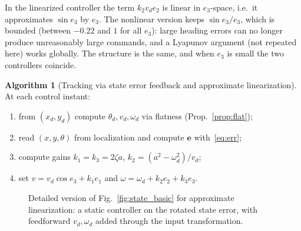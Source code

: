 \documentclass[11pt,a4paper]{article}
\newcommand{\vect}[1]{\bm{#1}}
\newcommand{\vd}{v_d}
\newcommand{\omd}{\omega_d}
\newcommand{\pd}{\vect{p}_d}
\newcommand{\qd}{\vect{q}_d}
\theoremstyle{plain}
\theoremstyle{definition}
\newtheorem{algorithm}[theorem]{Algorithm}
\theoremstyle{remark}
\begin{document}
\begin{intuition}
In the linearized controller the term $k_2\vd e_2$ is linear in $e_3$-space, i.e.\ it approximates $\sin e_3$ by $e_3$. The nonlinear version keeps $\sin e_3/e_3$, which is bounded (between $-0.22$ and $1$ for all $e_3$): large heading errors can no longer produce unreasonably large commands, and a Lyapunov argument (not repeated here) works globally. The structure is the same, and when $e_3$ is small the two controllers coincide.
\end{intuition}

\begin{algorithm}[Tracking via state error feedback and approximate linearization]
At each control instant:
\begin{enumerate}[nosep]
\item from $(x_d,y_d)$ compute $\theta_d,\vd,\omd$ via flatness (Prop.~\ref{prop:flat});
\item read $(x,y,\theta)$ from localization and compute $\vect e$ with~\eqref{eq:err};
\item compute gains $k_1=k_3=2\zeta a$, $k_2=(a^2-\omd^2)/\vd$;
\item set $v=\vd\cos e_3+k_1e_1$ and $\omega=\omd+k_2e_2+k_3e_3$.
\end{enumerate}
\end{algorithm}

\begin{figure}[H]
\centering
{}
\caption{Detailed version of Fig.~\ref{fig:state_basic} for approximate linearization: a static controller on the rotated state error, with feedforward $\vd,\omd$ added through the input transformation.}
\label{fig:state_scheme}
\end{figure}
\end{document}
